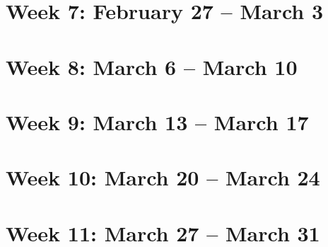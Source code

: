\section{Week 7: February 27 -- March 3}

\section{Week 8: March 6 -- March 10}

\section{Week 9: March 13 -- March 17}

\section{Week 10: March 20 -- March 24}

\section{Week 11: March 27 -- March 31}
